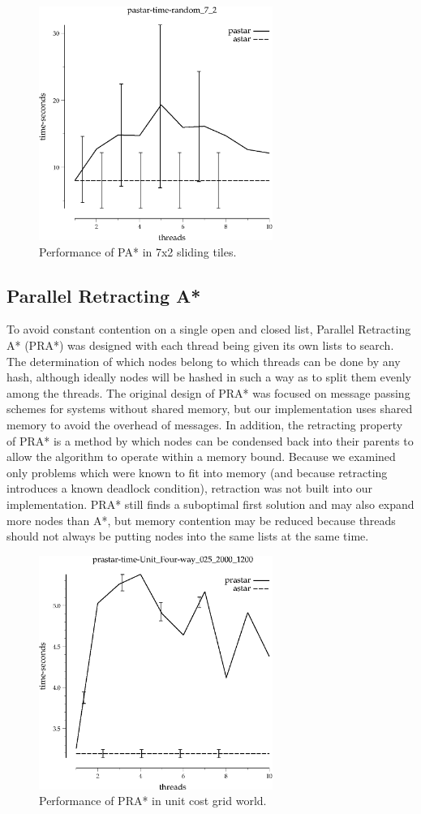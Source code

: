 \documentclass{article}
\begin{document}
\begin{figure}[h!]
\includegraphics[width=3in]{../graphs/seth/tiles-single/PAStar.eps}
\caption{Performance of PA* in 7x2 sliding tiles.}
\label{fig:PAStar-life}
\end{figure}
\subsection{Parallel Retracting A*}
To avoid constant contention on a single open and closed list, Parallel Retracting A* (PRA*) was designed with each thread being given its own lists to search. The determination of which nodes belong to which threads can be done by any hash, although ideally nodes will be hashed in such a way as to split them evenly among the threads. The original design of PRA* was focused on message passing schemes for systems without shared memory, but our implementation uses shared memory to avoid the overhead of messages. In addition, the retracting property of PRA* is a method by which nodes can be condensed back into their parents to allow the algorithm to operate within a memory bound. Because we examined only problems which were known to fit into memory (and because retracting introduces a known deadlock condition), retraction was not built into our implementation. PRA* still finds a suboptimal first solution and may also expand more nodes than A*, but memory contention may be reduced because threads should not always be putting nodes into the same lists at the same time.

\begin{figure}[h!]
\includegraphics[width=3in]{../graphs/seth/grid-unit-single/PRAStar.eps}
\caption{Performance of PRA* in unit cost grid world.}
\label{fig:PRAStar-grid}
\end{figure}
\end{document}
